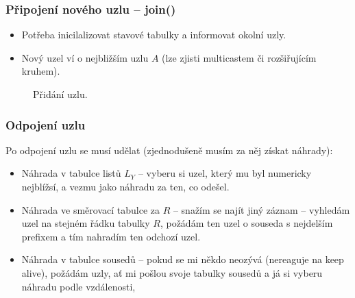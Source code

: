 \documentclass[11pt,a4paper]{article}
\begin{document}
\subsubsection*{Připojení nového uzlu -- join()}
\begin{itemize}
\item Potřeba inicilalizovat stavové tabulky a informovat okolní uzly.
\item Nový uzel ví o nejbližším uzlu $A$ (lze zjisti multicastem či rozšiřujícím kruhem).
\end{itemize}
\begin{figure}[ht!]
\begin{center}
\caption{Přidání uzlu.}
\label{pastry_join}
\end{center}
\end{figure}

\subsubsection*{Odpojení uzlu}
Po odpojení uzlu se musí udělat (zjednodušeně musím za něj získat náhrady):
\begin{itemize}
\item Náhrada v tabulce listů $L_Y$ -- vyberu si uzel, který mu byl numericky nejblížsí, a vezmu jako náhradu za ten, co odešel.
\item Náhrada ve směrovací tabulce za $R$ -- snažím se najít jiný záznam -- vyhledám uzel na stejném řádku tabulky $R$, požádám ten uzel o souseda s nejdelším prefixem a tím nahradím ten odchozí uzel.
\item Náhrada v tabulce sousedů -- pokud se mi někdo neozývá (nereaguje na keep alive), požádám uzly, ať mi pošlou svoje tabulky sousedů a já si vyberu náhradu podle vzdálenosti,
\end{itemize}
\end{document}

